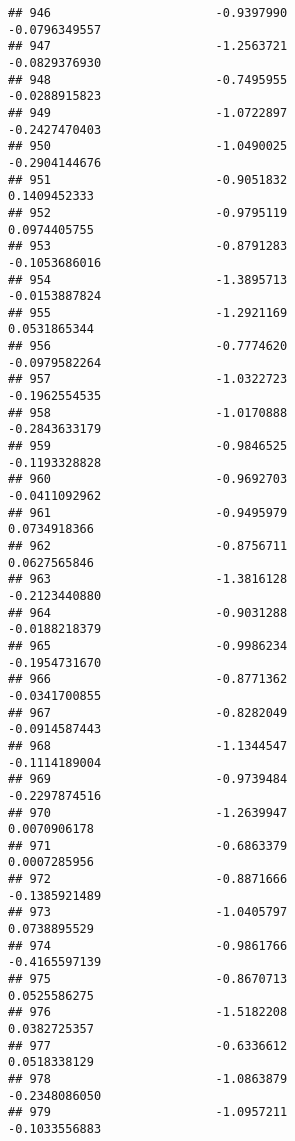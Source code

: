 \documentclass[
]{article}
\begin{document}
\begin{verbatim}
## 946                       -0.9397990                         -0.0796349557
## 947                       -1.2563721                         -0.0829376930
## 948                       -0.7495955                         -0.0288915823
## 949                       -1.0722897                         -0.2427470403
## 950                       -1.0490025                         -0.2904144676
## 951                       -0.9051832                          0.1409452333
## 952                       -0.9795119                          0.0974405755
## 953                       -0.8791283                         -0.1053686016
## 954                       -1.3895713                         -0.0153887824
## 955                       -1.2921169                          0.0531865344
## 956                       -0.7774620                         -0.0979582264
## 957                       -1.0322723                         -0.1962554535
## 958                       -1.0170888                         -0.2843633179
## 959                       -0.9846525                         -0.1193328828
## 960                       -0.9692703                         -0.0411092962
## 961                       -0.9495979                          0.0734918366
## 962                       -0.8756711                          0.0627565846
## 963                       -1.3816128                         -0.2123440880
## 964                       -0.9031288                         -0.0188218379
## 965                       -0.9986234                         -0.1954731670
## 966                       -0.8771362                         -0.0341700855
## 967                       -0.8282049                         -0.0914587443
## 968                       -1.1344547                         -0.1114189004
## 969                       -0.9739484                         -0.2297874516
## 970                       -1.2639947                          0.0070906178
## 971                       -0.6863379                          0.0007285956
## 972                       -0.8871666                         -0.1385921489
## 973                       -1.0405797                          0.0738895529
## 974                       -0.9861766                         -0.4165597139
## 975                       -0.8670713                          0.0525586275
## 976                       -1.5182208                          0.0382725357
## 977                       -0.6336612                          0.0518338129
## 978                       -1.0863879                         -0.2348086050
## 979                       -1.0957211                         -0.1033556883

\end{verbatim}
\end{document}
